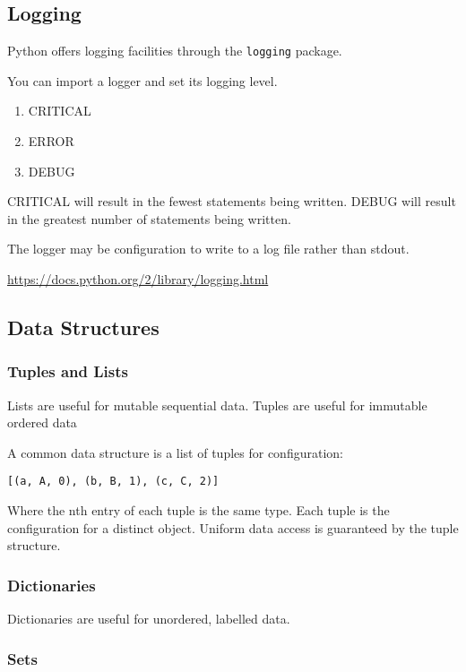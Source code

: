 \documentclass{article}
\begin{document}
\subsection{Logging}

Python offers logging facilities through the \texttt{logging} package.

You can import a logger and set its logging level.
\begin{enumerate}
\item CRITICAL
\item ERROR
\item DEBUG
\end{enumerate}
CRITICAL will result in the fewest statements being written.
DEBUG will result in the greatest number of statements being written.

The logger may be configuration to write to a log file rather
than stdout.

\url{https://docs.python.org/2/library/logging.html}

\subsection{Data Structures}

\subsubsection{Tuples and Lists}

Lists are useful for mutable sequential data.
Tuples are useful for immutable ordered data 

A common data structure is a list of tuples for configuration:
\begin{verbatim}
[(a, A, 0), (b, B, 1), (c, C, 2)]
\end{verbatim}
Where the nth entry of each tuple is the same type.
Each tuple is the configuration for a distinct object.
Uniform data access is guaranteed by the tuple structure.

\subsubsection{Dictionaries}

Dictionaries are useful for unordered, labelled data.

\subsubsection{Sets}
\end{document}
